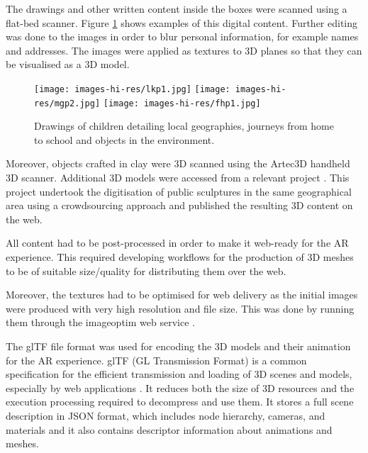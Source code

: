 \documentclass{egpubl}
\begin{document}
The drawings and other written content inside the boxes were scanned using a
flat-bed scanner. Figure \ref{fig:drawingmaps} shows examples of this digital
content. Further editing was done to the images in order to blur personal
information, for example names and addresses. The images were applied as
textures to 3D planes so that they can be visualised as a 3D model.

\begin{figure}[ht] \centering
\texttt{[image: images-hi-res/lkp1.jpg]}
\texttt{[image: images-hi-res/mgp2.jpg]}
\texttt{[image: images-hi-res/fhp1.jpg]} 
\caption{Drawings
of children detailing local geographies, journeys from home to school and
objects in the environment.} \label{fig:drawingmaps} 
\end{figure}

Moreover, objects crafted in clay were 3D scanned using the Artec3D handheld
3D scanner. Additional 3D models were accessed from a relevant project
\cite{14f05b94a1844f5e850c87fc9d042c59}. This project undertook the
digitisation of public sculptures in the same geographical area using a
crowdsourcing approach and published the resulting 3D content on the web.

All content had to be post-processed in order to make it web-ready for the AR
experience. This required developing workflows for the production of 3D meshes
to be of suitable size/quality for distributing them over the web. 

Moreover, the textures had to be optimised for web delivery as the initial images were
produced with very high resolution and file size. This was done by running
them through the imageoptim web service \cite{ImageOptim}.  

The glTF file format was used for encoding the 3D models and their animation
for the AR experience. glTF (GL Transmission Format) is a common specification
for the efficient transmission and loading of 3D scenes and models, especially
by web applications \cite{khronos}. It reduces both the size of 3D resources
and the execution processing required to decompress and use them. It stores a
full scene description in JSON format, which includes node hierarchy, cameras,
and materials and it also contains descriptor information about animations and
meshes.
\end{document}
